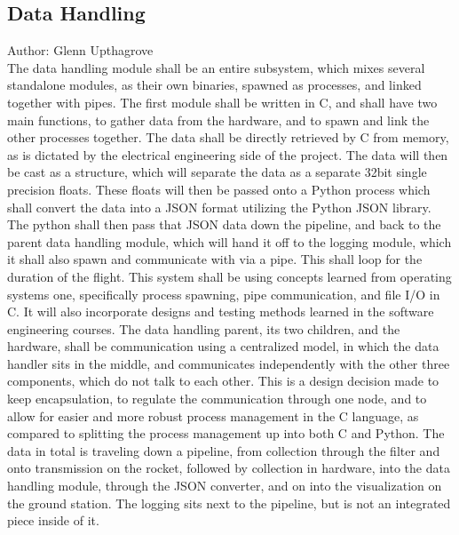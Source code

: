 \documentclass[onecolumn, draftclsnofoot,10pt, compsoc]{IEEEtran}
\begin{document}
\subsection {Data Handling}
Author: Glenn Upthagrove \\
The data handling module shall be an entire subsystem, which mixes several standalone modules, as their own binaries, spawned as processes, and linked together with pipes. The first module shall be written in C, and shall have two main functions, to gather data from the hardware, and to spawn and link the other processes together. The data shall be directly retrieved by C from memory, as is dictated by the electrical engineering side of the project. The data will then be cast as a structure, which will separate the data as a separate 32bit single precision floats. These floats will then be passed onto a Python process which shall convert the data into a JSON format utilizing the Python JSON library. The python shall then pass that JSON data down the pipeline, and back to the parent data handling module, which will hand it off to the logging module, which it shall also spawn and communicate with via a pipe. This shall loop for the duration of the flight. This system shall be using concepts learned from operating systems one, specifically process spawning, pipe communication, and file I/O in C. It will also incorporate designs and testing methods learned in the software engineering courses. \cite{refjson} \cite{refpython} 
The data handling parent, its two children, and the hardware, shall be communication using a centralized model, in which the data handler sits in the middle, and communicates independently with the other three components, which do not talk to each other. This is a design decision made to keep encapsulation, to regulate the communication through one node, and to allow for easier and more robust process management in the C language, as compared to splitting the process management up into both C and Python. The data in total is traveling down a pipeline, from collection through the filter and onto transmission on the rocket, followed by collection in hardware, into the data handling module, through the JSON converter, and on into the visualization on the ground station. The logging sits next to the pipeline, but is not an integrated piece inside of it. 
\end{document}
